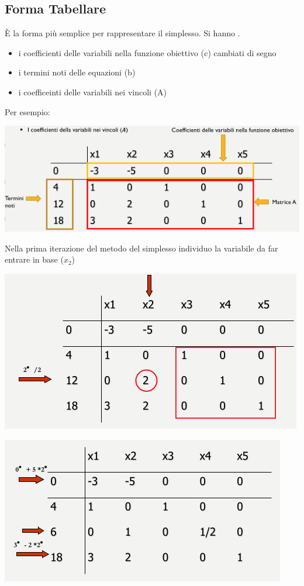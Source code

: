 \message{ !name(ro.tex)}\documentclass[a4paper,12pt, oneside]{book}
\begin{document}
\subsection{Forma Tabellare}
È la forma più semplice per rappresentare il simplesso. Si hanno .
\begin{itemize}
  \item i coefficienti delle variabili nella funzione obiettivo
  (c) cambiati di segno
  \item i termini noti delle equazioni (b)
  \item i coefficeinti delle variabili nei vincoli (A)
\end{itemize}
\newpage
Per esempio:
\begin{center}
  \includegraphics[scale = 0.8]{img/tab.png}
\end{center}
Nella prima iterazione del metodo del simplesso individuo la variabile
da far entrare in base ($x_2$)
\begin{center}
  \includegraphics[scale = 0.8]{img/tab2.png}
\end{center}
\begin{center}
  \includegraphics[scale = 0.8]{img/tab3.png}
\end{center}
\end{document}

